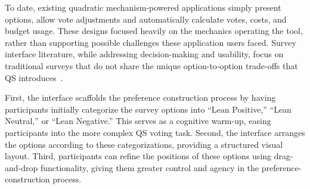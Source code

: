 
To date, existing quadratic mechanism-powered applications simply present options, allow vote adjustments and automatically calculate votes, costs, and budget usage. These designs focused heavily on the mechanics operating the tool, rather than supporting possible challenges these application users faced. Survey interface literature, while addressing decision-making and usability, focus on traditional surveys that do not share the unique option-to-option trade-offs that QS introduces~\cite{engstrom2020politics, weijtersEffectRatingScale2010, kierujVariationsResponseStyle2010, toepoelSmileysStarsHearts2019, farzandAestheticsEvaluatingResponse2024, pielotDidYouMisclick2024}.~


 First, the interface scaffolds the preference construction process by having participants initially categorize the survey options into ``Lean Positive,'' ``Lean Neutral,'' or ``Lean Negative.'' This serves as a cognitive warm-up, easing participants into the more complex QS voting task. Second, the interface arranges the options according to these categorizations, providing a structured visual layout. Third, participants can refine the positions of these options using drag-and-drop functionality, giving them greater control and agency in the preference-construction process. %

